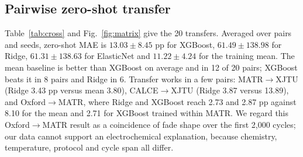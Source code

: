 \documentclass[journal]{IEEEtran}
\begin{document}
\subsection{Pairwise zero-shot transfer}
Table~\ref{tab:cross} and Fig.~\ref{fig:matrix} give the 20 transfers. Averaged over pairs and seeds, zero-shot MAE is $13.03\pm8.45$ pp for XGBoost, $61.49\pm138.98$ for Ridge, $61.31\pm138.63$ for ElasticNet and $11.22\pm4.24$ for the training mean. The mean baseline is better than XGBoost on average and in 12 of 20 pairs; XGBoost beats it in 8 pairs and Ridge in 6. Transfer works in a few pairs: MATR$\to$XJTU (Ridge 3.43 pp versus mean 3.80), CALCE$\to$XJTU (Ridge 3.87 versus 13.89), and Oxford$\to$MATR, where Ridge and XGBoost reach 2.73 and 2.87 pp against 8.10 for the mean and 2.71 for XGBoost trained within MATR. We regard this Oxford$\to$MATR result as a coincidence of fade shape over the first 2,000 cycles; our data cannot support an electrochemical explanation, because chemistry, temperature, protocol and cycle span all differ.
\end{document}
